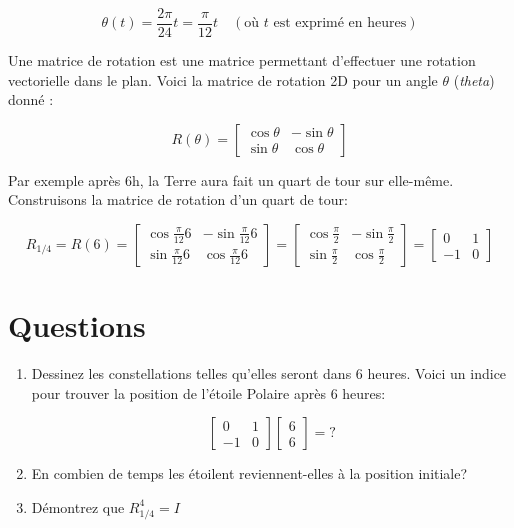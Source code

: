\documentclass[11pt,letterpaper]{article}
\begin{document}
\[
  \theta(t) = \frac{2\pi}{24}t
            = \frac{\pi}{12}t \quad (\text{où } t \text{ est exprimé en heures})
\]

Une matrice de rotation est une matrice permettant d'effectuer une rotation
vectorielle dans le plan. Voici la matrice de rotation 2D pour un angle $\theta$
(\emph{theta}) donné :

\[
  R(\theta) = \begin{bmatrix}
                \cos\theta & -\sin\theta \\
                \sin\theta & \cos\theta
              \end{bmatrix}
\]

Par exemple après 6h, la Terre aura fait un quart de tour sur elle-même.
Construisons la matrice de rotation d'un quart de tour:

\[
  R_{1/4} = R(6)
          = \begin{bmatrix}
              \cos \frac{\pi}{12}6 & -\sin \frac{\pi}{12}6 \\
              \sin \frac{\pi}{12}6 & \cos \frac{\pi}{12}6
            \end{bmatrix}
          = \begin{bmatrix}
              \cos \frac{\pi}{2} & -\sin \frac{\pi}{2} \\
              \sin \frac{\pi}{2} & \cos \frac{\pi}{2}
            \end{bmatrix}
          = \begin{bmatrix}
              0  & 1 \\
              -1 & 0
            \end{bmatrix}
\]

\section{Questions}

\begin{enumerate}
  \item Dessinez les constellations telles qu'elles seront dans 6 heures. Voici
        un indice pour trouver la position de l'étoile Polaire après 6 heures:

        \[
          \begin{bmatrix}
            0  & 1 \\
            -1 & 0
          \end{bmatrix} \begin{bmatrix}
                          6 \\
                          6
                        \end{bmatrix}
          = ?
        \]

  \item En combien de temps les étoilent reviennent-elles à la position
        initiale?
  \item Démontrez que $R^4_{1/4} = I$
\end{enumerate}
\end{document}
